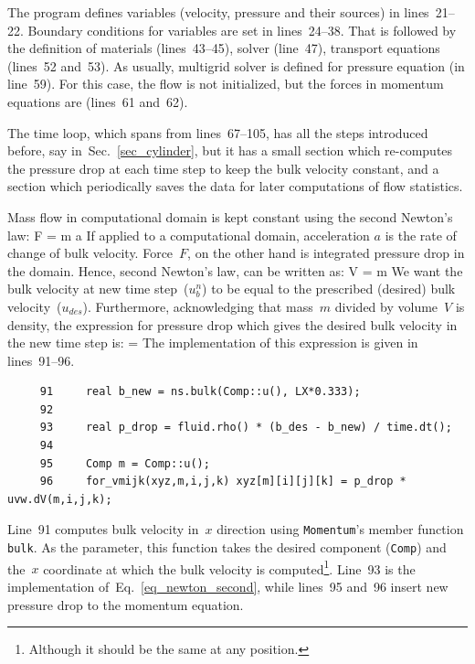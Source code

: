 The program defines variables (velocity, pressure and their sources)
in lines~21--22. Boundary conditions for variables are set in lines~24--38.
That is followed by the definition of materials (lines~43--45),
solver (line~47), transport equations (lines~52 and~53). As usually,
multigrid solver is defined for pressure equation (in line~59).
For this case, the flow is not initialized, but the forces in momentum
equations are (lines~61 and~62). 

The time loop, which spans from lines~67--105, has all the steps
introduced before, say in~Sec.~\ref{sec_cylinder}, but it has a
small section which re-computes the pressure drop at each time 
step to keep the bulk velocity constant, and a section which 
periodically saves the data for later computations of flow
statistics.

Mass flow in computational domain is kept constant using the second
Newton's law:
%
\be
  F = m \cdot a \; \; \; \; [N]
\ee
%
If applied to a computational domain, acceleration $a$ is the rate
of change of bulk velocity. Force~$F$, on the other hand is integrated
pressure drop in the domain. Hence, second Newton's law, can be
written as:
%
\be
   V 
  =
  m \cdot {} \; \; \; \; [N]
\ee
%
We want the bulk velocity at new time step~($u_b^n$) to be equal to
the prescribed (desired) bulk velocity~($u_{des}$). Furthermore,
acknowledging that mass~$m$ divided by volume~$V$ is density, the
expression for pressure drop which gives the desired bulk velocity
in the new time step is:
%
\be
  = 
  \rho \cdot {} 
  \label{eq_newton_second}
\ee
%
The implementation of this expression is given in lines~91--96.
%
{\small \begin{verbatim}
     91     real b_new = ns.bulk(Comp::u(), LX*0.333);
     92
     93     real p_drop = fluid.rho() * (b_des - b_new) / time.dt();
     94
     95     Comp m = Comp::u();
     96     for_vmijk(xyz,m,i,j,k) xyz[m][i][j][k] = p_drop * uvw.dV(m,i,j,k);
\end{verbatim}}
%
Line~91 computes bulk velocity in~$x$ direction using {\tt Momentum}'s
member function {\tt bulk}. As the parameter, this function takes the
desired component ({\tt Comp}) and the~$x$ coordinate at which the bulk 
velocity is computed\footnote{Although
it should be the same at any position.}. Line~93 is the implementation
of~Eq.~\ref{eq_newton_second}, while lines~95 and~96 insert new pressure
drop to the momentum equation.

